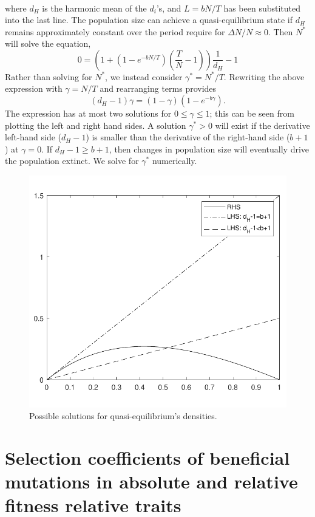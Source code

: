 \documentclass[9pt,twocolumn,twoside]{article}
\begin{document}
\begin{appendix}
\[\begin{aligned}
\end{aligned}
\]
where $d_H$ is the harmonic mean of the $d_i$'s, and $L=bN/T$ has been substituted into the last line. The population size can achieve a quasi-equilibrium state if $d_H$ remains approximately constant over the period require for $\Delta N/N \approx 0$. Then $N^*$ will solve the equation,
\[
0 =\left(1+(1-e^{-bN/T})\left(\frac{T}{N}-1\right)\right)\frac{1}{d_H}-1
\]
Rather than solving for $N^*$, we instead consider $\gamma^* = N^*/T$. Rewriting the above expression with $\gamma = N/T$ and rearranging terms provides
\[
(d_H -1)\gamma = (1-\gamma)(1-e^{-b\gamma}).
\]
The expression has at most two solutions for $0 \leq \gamma \leq 1$; this can be seen from plotting the left and right hand sides. A solution $\gamma^*>0$ will exist if the derivative left-hand side ($d_H-1$) is smaller than the derivative of the right-hand side ($b+1$) at $\gamma =0$. If $d_H-1\geq b+1$, then changes in population size will eventually drive the population extinct. We solve for $\gamma^*$ numerically.
\begin{figure}[h!]
    \centering
    \includegraphics[scale=.6]{densitySoltn.pdf}
    \caption{Possible solutions for quasi-equilibrium's densities.}
    \label{fig:qEdensity}
\end{figure}

\section{Selection coefficients of beneficial mutations in absolute and relative fitness relative traits}


\end{appendix}
\end{document}

